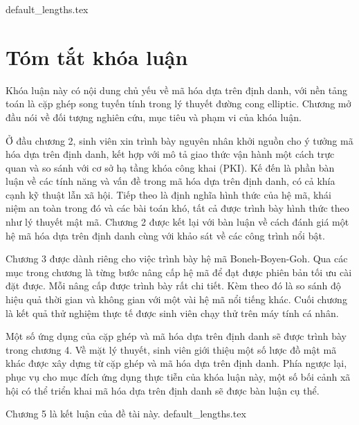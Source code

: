 \documentclass[class=report, crop=false]{standalone}
\begin{document}
	{default_lengths.tex}
	\chapter*{Tóm tắt khóa luận}
	Khóa luận này có nội dung chủ yếu về mã hóa dựa trên định danh, với nền tảng toán là cặp ghép song tuyến tính trong lý thuyết đường cong elliptic. Chương mở đầu nói về đối tượng nghiên cứu, mục tiêu và phạm vi của khóa luận.

	Ở đầu chương 2, sinh viên xin trình bày nguyên nhân khởi nguồn cho ý tưởng mã hóa dựa trên định danh, kết hợp với mô tả giao thức vận hành một cách trực quan và so sánh với cơ sở hạ tầng khóa công khai (PKI). Kế đến là phần bàn luận về các tính năng và vấn đề trong mã hóa dựa trên định danh, có cả khía cạnh kỹ thuật lẫn xã hội. Tiếp theo là định nghĩa hình thức của hệ mã, khái niệm an toàn trong đó và các bài toán khó, tất cả được trình bày hình thức theo như lý thuyết mật mã. Chương 2 được kết lại với bàn luận về cách đánh giá một hệ mã hóa dựa trên định danh cùng với khảo sát về các công trình nổi bật.

	Chương 3 được dành riêng cho việc trình bày hệ mã Boneh-Boyen-Goh. Qua các mục trong chương là từng bước nâng cấp hệ mã để đạt được phiên bản tối ưu cài đặt được. Mỗi nâng cấp được trình bày rất chi tiết. Kèm theo đó là so sánh độ hiệu quả thời gian và không gian với một vài hệ mã nổi tiếng khác. Cuối chương là kết quả thử nghiệm thực tế được sinh viên chạy thử trên máy tính cá nhân.

	Một số ứng dụng của cặp ghép và mã hóa dựa trên định danh sẽ được trình bày trong chương 4. Về mặt lý thuyết, sinh viên giới thiệu một số lược đồ mật mã khác được xây dựng từ cặp ghép và mã hóa dựa trên định danh. Phía ngược lại, phục vụ cho mục đích ứng dụng thực tiễn của khóa luận này, một số bối cảnh xã hội có thể triển khai mã hóa dựa trên định danh sẽ được bàn luận cụ thể.

	Chương 5 là kết luận của đề tài này.
	\newpage
	{default_lengths.tex}
\end{document}
